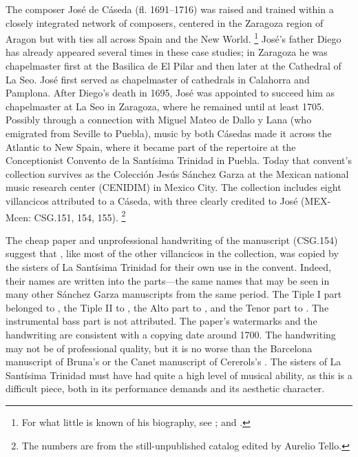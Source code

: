 The composer José de Cáseda (fl. 1691--1716) was raised and trained within a closely integrated network of composers, centered in the Zaragoza region of Aragon but with ties all across Spain and the New World.%
	\footnote{
For what little is known of his biography, see \autocite[120--121]{Calahorra:Zaragoza2}; and \autocite{Stevenson:CasedaD}. 
	}
José's father Diego has already appeared several times in these case studies; in Zaragoza he was chapelmaster first at the Basilica de El Pilar and then later at the Cathedral of La Seo.
José first served as chapelmaster of cathedrals in Calahorra and Pamplona. 
After Diego's death in 1695, José was appointed to succeed him as chapelmaster at La Seo in Zaragoza, where he remained until at least 1705.
Possibly through a connection with Miguel Mateo de Dallo y Lana (who emigrated from Seville to Puebla), music by both Cásedas made it across the Atlantic to New Spain, where it became part of the repertoire at the Conceptionist Convento de la Santísima Trinidad in Puebla.
Today that convent's collection survives as the Colección Jesús Sánchez Garza at the Mexican national music research center (CENIDIM) in Mexico City.
The collection includes eight villancicos attributed to a Cáseda, with three clearly credited to José (MEX-Mcen: CSG.151, 154, 155).%
	\footnote{
	The numbers are from the still-unpublished catalog edited by Aurelio Tello.
	}

The cheap paper and unprofessional handwriting of the manuscript (CSG.154) suggest that , like most of the other villancicos in the collection, was copied by the sisters of La Santísima Trinidad for their own use in the convent.
Indeed, their names are written into the parts---the same names that may be seen in many other Sánchez Garza manuscripts from the same period.
The Tiple I part belonged to , the Tiple II to , the Alto part to , and the Tenor part to .
The instrumental bass part is not attributed.
The paper's watermarks and the handwriting are consistent with a copying date around 1700.
The handwriting may not be of professional quality, but it is no worse than the Barcelona manuscript of Bruna's  or the Canet manuscript of Cererols's . 
The sisters of La Santísima Trinidad must have had quite a high level of musical ability, as this is a difficult piece, both in its performance demands and its aesthetic character. 

